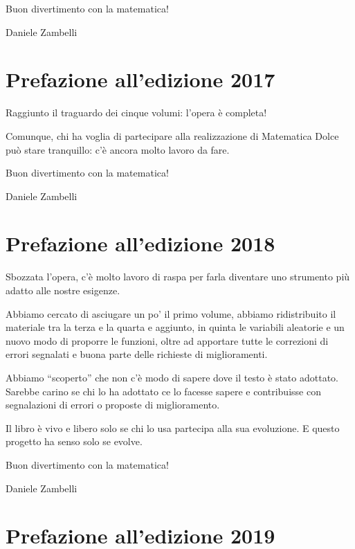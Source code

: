 Buon divertimento con la matematica!

\begin{flushright}
Daniele Zambelli
\end{flushright}

\section{Prefazione all'edizione 2017}

Raggiunto il traguardo dei cinque volumi: l'opera è completa!

Comunque, chi ha voglia di partecipare alla realizzazione di Matematica Dolce
può stare tranquillo:
c'è ancora molto lavoro da fare.

Buon divertimento con la matematica!

\begin{flushright}
Daniele Zambelli
\end{flushright}

\section{Prefazione all'edizione 2018}

Sbozzata l'opera, c'è molto lavoro di raspa per farla diventare uno
strumento più adatto alle nostre esigenze.

Abbiamo cercato di asciugare un po' il primo volume, abbiamo ridistribuito
il materiale tra la terza e la quarta e aggiunto, in quinta le variabili
aleatorie e un nuovo modo di proporre le funzioni,
oltre ad apportare tutte le correzioni di errori segnalati e buona parte
delle richieste di miglioramenti.

Abbiamo ``scoperto'' che non c'è modo di sapere dove il testo è stato
adottato. Sarebbe carino se chi lo ha adottato ce lo facesse sapere e
contribuisse con segnalazioni di errori o proposte di miglioramento.

Il libro è vivo e libero solo se chi lo usa partecipa alla sua evoluzione.
E questo progetto ha senso solo se evolve.

Buon divertimento con la matematica!

\begin{flushright}
Daniele Zambelli
\end{flushright}

\section{Prefazione all'edizione 2019}

